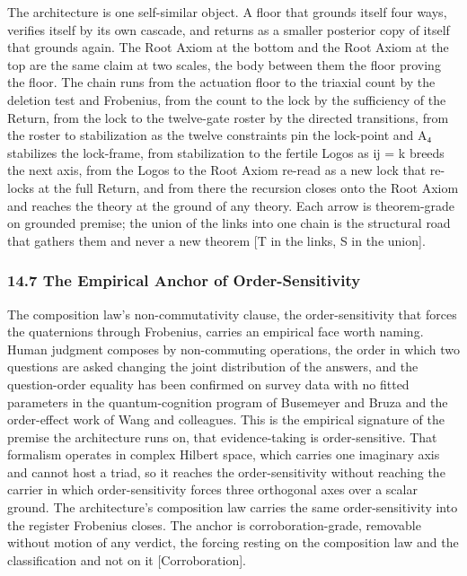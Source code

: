 \documentclass[10pt,twocolumn]{article}
\begin{document}
The architecture is one self-similar object. A floor that grounds itself
four ways, verifies itself by its own cascade, and returns as a smaller
posterior copy of itself that grounds again. The Root Axiom at the
bottom and the Root Axiom at the top are the same claim at two scales,
the body between them the floor proving the floor. The chain runs from
the actuation floor to the triaxial count by the deletion test and
Frobenius, from the count to the lock by the sufficiency of the Return,
from the lock to the twelve-gate roster by the directed transitions,
from the roster to stabilization as the twelve constraints pin the
lock-point and A₄ stabilizes the lock-frame, from stabilization to the
fertile Logos as ij = k breeds the next axis, from the Logos to the Root
Axiom re-read as a new lock that re-locks at the full Return, and from
there the recursion closes onto the Root Axiom and reaches the theory at
the ground of any theory. Each arrow is theorem-grade on grounded
premise; the union of the links into one chain is the structural road
that gathers them and never a new theorem {[}T in the links, S in the
union{]}.

\hypertarget{the-empirical-anchor-of-order-sensitivity}{%
\subsubsection{14.7 The Empirical Anchor of
Order-Sensitivity}\label{the-empirical-anchor-of-order-sensitivity}}

The composition law's non-commutativity clause, the order-sensitivity
that forces the quaternions through Frobenius, carries an empirical face
worth naming. Human judgment composes by non-commuting operations, the
order in which two questions are asked changing the joint distribution
of the answers, and the question-order equality has been confirmed on
survey data with no fitted parameters in the quantum-cognition program
of Busemeyer and Bruza and the order-effect work of Wang and colleagues.
This is the empirical signature of the premise the architecture runs on,
that evidence-taking is order-sensitive. That formalism operates in
complex Hilbert space, which carries one imaginary axis and cannot host
a triad, so it reaches the order-sensitivity without reaching the
carrier in which order-sensitivity forces three orthogonal axes over a
scalar ground. The architecture's composition law carries the same
order-sensitivity into the register Frobenius closes. The anchor is
corroboration-grade, removable without motion of any verdict, the
forcing resting on the composition law and the classification and not on
it {[}Corroboration{]}.
\end{document}

